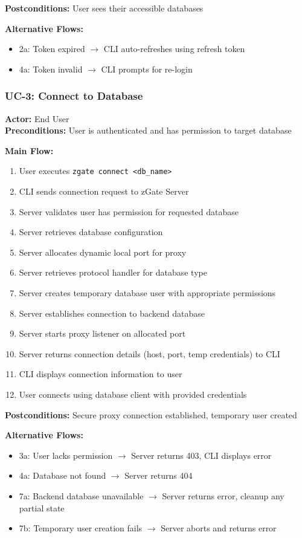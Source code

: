 \textbf{Postconditions:} User sees their accessible databases

\textbf{Alternative Flows:}
\begin{itemize}
    \item 2a: Token expired $\rightarrow$ CLI auto-refreshes using refresh token
    \item 4a: Token invalid $\rightarrow$ CLI prompts for re-login
\end{itemize}

\subsubsection{UC-3: Connect to Database}
\textbf{Actor:} End User \\
\textbf{Preconditions:} User is authenticated and has permission to target database

\textbf{Main Flow:}
\begin{enumerate}
    \item User executes \texttt{zgate connect <db\_name>}
    \item CLI sends connection request to zGate Server
    \item Server validates user has permission for requested database
    \item Server retrieves database configuration
    \item Server allocates dynamic local port for proxy
    \item Server retrieves protocol handler for database type
    \item Server creates temporary database user with appropriate permissions
    \item Server establishes connection to backend database
    \item Server starts proxy listener on allocated port
    \item Server returns connection details (host, port, temp credentials) to CLI
    \item CLI displays connection information to user
    \item User connects using database client with provided credentials
\end{enumerate}

\textbf{Postconditions:} Secure proxy connection established, temporary user created

\textbf{Alternative Flows:}
\begin{itemize}
    \item 3a: User lacks permission $\rightarrow$ Server returns 403, CLI displays error
    \item 4a: Database not found $\rightarrow$ Server returns 404
    \item 7a: Backend database unavailable $\rightarrow$ Server returns error, cleanup any partial state
    \item 7b: Temporary user creation fails $\rightarrow$ Server aborts and returns error
\end{itemize}

